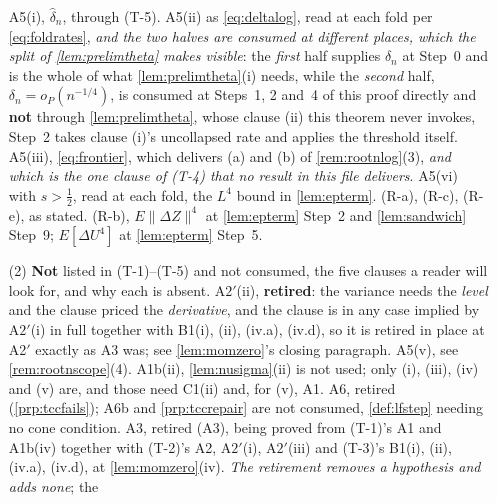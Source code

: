 \begin{remark}
\begin{enumerate}
A5(i), $\hat\delta_n$, through (T-5).
A5(ii) as \eqref{eq:deltalog}, read at each fold per \eqref{eq:foldrates}, \emph{and the two halves are
consumed at different places, which the split of \cref{lem:prelimtheta} makes visible}: the \emph{first}
half supplies $\delta_n$ at Step~0 and is the whole of what \cref{lem:prelimtheta}\textup{(i)} needs, while
the \emph{second} half, $\delta_n=o_P(n^{-1/4})$, is consumed at Steps~1, 2 and~4 of this proof directly and
\textbf{not} through \cref{lem:prelimtheta}, whose clause \textup{(ii)} this theorem never invokes, Step~2
takes clause \textup{(i)}'s uncollapsed rate and applies the threshold itself. A5(iii), \eqref{eq:frontier},
which delivers (a) and (b) of \cref{rem:rootnlog}(3), \emph{and which is the one clause of (T-4) that no
result in this file delivers}. A5(vi) with $s>\tfrac12$, read at each fold, the $L^{4}$ bound in
\cref{lem:epterm}. (R-a), (R-c), (R-e), as stated. (R-b), $E\|\Delta Z\|^{4}$ at \cref{lem:epterm}
Step~2 and \cref{lem:sandwich} Step~9; $E[\Delta U^{4}]$ at \cref{lem:epterm} Step~5.
\item[(2)] \textbf{Not} listed in \textup{(T-1)}--\textup{(T-5)} and not consumed, the five clauses
a reader will look for, and why each is absent. A$2'$(ii), \textbf{retired}: the
variance needs the \emph{level} and the clause priced the \emph{derivative}, and the clause is in any case
implied by A$2'$(i) in full together with B1(i), (ii), (iv.a), (iv.d), so it is retired in place at
A2$'$ exactly as A3 was; see \cref{lem:momzero}'s closing paragraph. A5(v), see
\cref{rem:rootnscope}\textup{(4)}. A1b(ii), \cref{lem:nusigma}(ii) is not used; only
(i), (iii), (iv) and (v) are, and those need C1(ii) and, for (v), A1. A6, retired
(\cref{prp:tccfails}); A6b and \cref{prp:tccrepair} are not consumed, \cref{def:lfstep} needing no cone
condition. A3, retired (A3), being proved from (T-1)'s A1 and A1b(iv) together
with (T-2)'s A2, A$2'$(i), A$2'$(iii) and (T-3)'s B1(i), (ii), (iv.a), (iv.d), at
\cref{lem:momzero}\textup{(iv)}. \emph{The retirement removes a hypothesis and adds none}; the

\end{enumerate}
\end{remark}
